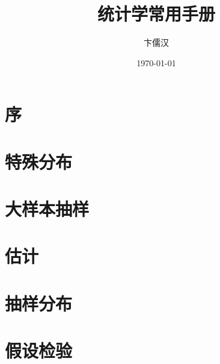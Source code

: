 \documentclass[cn,single]{elegantbook}
\title{统计学常用手册}
\author{卞儒汉}
\date{\today}
\begin{document}

\tableofcontents
%

\chapter*{序}

\chapter{特殊分布}
	
	
	
	
	

\chapter{大样本抽样}
	
	

\chapter{估计}
	

\chapter{抽样分布}
	
	
	

\chapter{假设检验}
	
	
\end{document}
